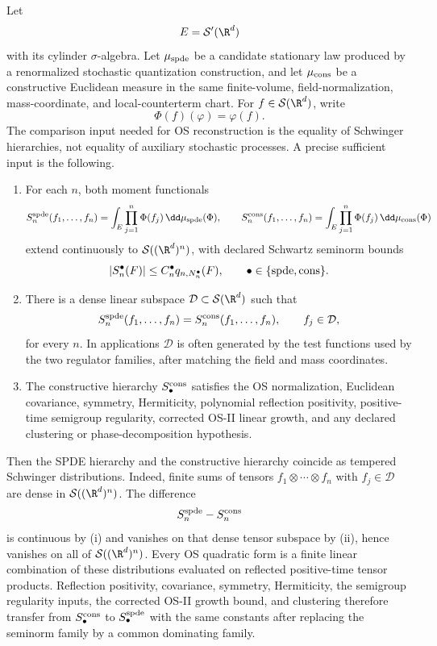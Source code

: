 \begin{construction}
\label{con:spde-common-schwinger-hierarchy-comparison}
Let
\[
  E=\mathcal S'(\R^d)
\]
with its cylinder \(\sigma\)-algebra.  Let \(\mu_{\rm spde}\) be a candidate
stationary law produced by a renormalized stochastic quantization construction,
and let \(\mu_{\rm cons}\) be a constructive Euclidean measure in the same
finite-volume, field-normalization, mass-coordinate, and local-counterterm
chart.  For \(f\in\mathcal S(\R^d)\), write
\[
  \Phi(f)(\varphi)=\varphi(f).
\]
The comparison input needed for OS reconstruction is the equality of
Schwinger hierarchies, not equality of auxiliary stochastic processes.  A
precise sufficient input is the following.
\begin{enumerate}[label=(\roman*)]
  \item For each \(n\), both moment functionals
  \[
    S_n^{\rm spde}(f_1,\ldots,f_n)
    =
    \int_E\prod_{j=1}^n\Phi(f_j)\,\dd\mu_{\rm spde}(\Phi),
    \qquad
    S_n^{\rm cons}(f_1,\ldots,f_n)
    =
    \int_E\prod_{j=1}^n\Phi(f_j)\,\dd\mu_{\rm cons}(\Phi)
  \]
  extend continuously to \(\mathcal S((\R^d)^n)\), with declared Schwartz
  seminorm bounds
  \[
    |S_n^\bullet(F)|\leq C_n^\bullet q_{n,N_n^\bullet}(F),
    \qquad \bullet\in\{{\rm spde},{\rm cons}\}.
  \]
  \item There is a dense linear subspace \(\mathcal D\subset\mathcal S(\R^d)\)
  such that
  \[
    S_n^{\rm spde}(f_1,\ldots,f_n)
    =
    S_n^{\rm cons}(f_1,\ldots,f_n),
    \qquad f_j\in\mathcal D,
  \]
  for every \(n\).  In applications \(\mathcal D\) is often generated by the
  test functions used by the two regulator families, after matching the field
  and mass coordinates.
  \item The constructive hierarchy \(S_\bullet^{\rm cons}\) satisfies the OS
  normalization, Euclidean covariance, symmetry, Hermiticity, polynomial
  reflection positivity, positive-time semigroup regularity, corrected OS-II
  linear growth, and any declared clustering or phase-decomposition
  hypothesis.
\end{enumerate}
Then the SPDE hierarchy and the constructive hierarchy coincide as tempered
Schwinger distributions.  Indeed, finite sums of tensors
\(f_1\otimes\cdots\otimes f_n\) with \(f_j\in\mathcal D\) are dense in
\(\mathcal S((\R^d)^n)\).  The difference
\[
  S_n^{\rm spde}-S_n^{\rm cons}
\]
is continuous by (i) and vanishes on that dense tensor subspace by (ii), hence
vanishes on all of \(\mathcal S((\R^d)^n)\).  Every OS quadratic form is a
finite linear combination of these distributions evaluated on reflected
positive-time tensor products.  Reflection positivity, covariance, symmetry,
Hermiticity, the semigroup regularity inputs, the corrected OS-II growth bound,
and clustering therefore transfer from \(S_\bullet^{\rm cons}\) to
\(S_\bullet^{\rm spde}\) with the same constants after replacing the seminorm
family by a common dominating family.


\end{construction}
